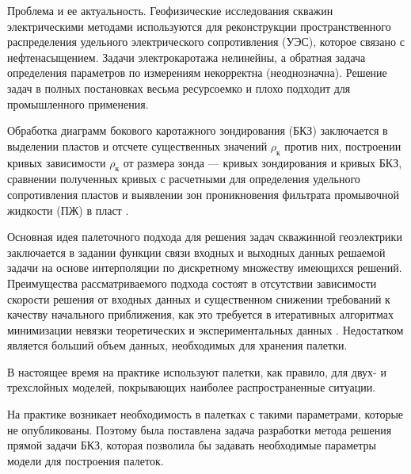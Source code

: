 
Проблема и ее актуальность. Геофизические исследования скважин
электрическими методами используются для
реконструкции пространственного распределения удельного электрического
сопротивления (УЭС), которое связано с нефтенасыщением.
Задачи электрокаротажа нелинейны, а обратная
задача определения параметров по измерениям
некорректна (неоднозначна). Решение задач в
полных постановках весьма ресурсоемко и плохо
подходит для промышленного применения.

Обработка диаграмм бокового каротажного зондирования (БКЗ) заключается в выделении пластов
и отсчете существенных значений $\rho_\text {к}$ против них, построении
кривых зависимости $\rho_\text {к}$ от размера зонда --- кривых зондирования
и кривых БКЗ, сравнении полученных кривых с расчетными
для определения удельного сопротивления пластов и выявлении
зон проникновения фильтрата промывочной жидкости (ПЖ) в пласт \cite{valiullin}.

Основная идея палеточного подхода для решения задач скважинной
геоэлектрики заключается в задании функции связи входных
и выходных данных решаемой задачи на основе интерполяции по
дискретному множеству имеющихся решений.
Преимущества рассматриваемого
подхода состоят в отсутствии зависимости скорости
решения от входных данных и существенном снижении требований к
качеству начального приближения, как это требуется в итеративных алгоритмах
минимизации невязки теоретических и экспериментальных данных \cite{palette}.
Недостатком является больший объем данных, необходимых для хранения палетки.

В настоящее
время на практике используют палетки, как правило, для
двух- и трехслойных моделей, покрывающих наиболее
распространенные ситуации.

На практике возникает необходимость в палетках с такими параметрами, которые не опубликованы. Поэтому была поставлена задача разработки метода решения прямой задачи БКЗ, которая позволила бы задавать необходимые параметры модели для построения палеток.

\clearpage
